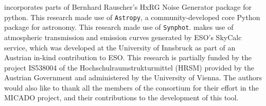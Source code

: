 
\ScopeSim{} incorporates parts of Bernhard Rauscher's HxRG Noise Generator package for python\cite{nghxrg}.
This research made use of \lstinline{Astropy}, a community-developed core Python package for astronomy\cite{astropy1, astropy2}.
This research made use of \lstinline{Synphot}\cite{synphot}.
\ScopeSim{} makes use of atmospheric transmission and emission curves generated by ESO's SkyCalc service, which was developed at the University of Innsbruck as part of an Austrian in-kind contribution to ESO.
This research is partially funded by the project IS538004 of the Hochschulraumstrukturmittel (HRSM) provided by the Austrian Government and administered by the University of Vienna.
The authors would also like to thank all the members of the consortium for their effort in the MICADO project, and their contributions to the development of this tool.
